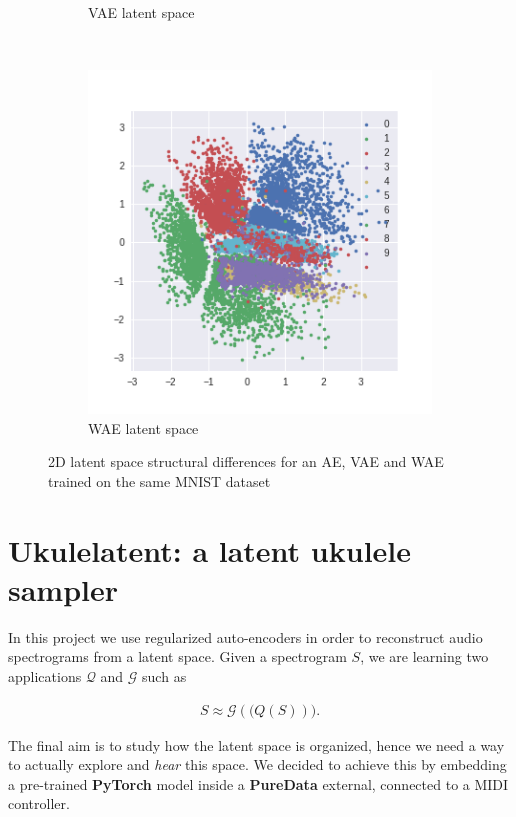 \documentclass[11pt, english]{article}
\begin{document}
\begin{figure}[h!]
{{\begin{subfigure}[t]{.35\linewidth}
    \caption{VAE latent space}
    \end{subfigure}
    ~
    \begin{subfigure}[t]{.35\linewidth}
    \centering \includegraphics[width=\linewidth]{img/WAE_Z.png}
    \caption{WAE latent space}
    \end{subfigure}
    }}
    \caption{2D latent space structural differences for an AE, VAE and WAE trained on the same MNIST dataset}\label{fig:latentspaceorg}

\end{figure}

\newpage

\section{Ukulelatent: a latent ukulele sampler}

In this project we use regularized auto-encoders in order to reconstruct audio spectrograms from a latent space. Given a spectrogram $S$, we are learning two applications $\mathcal Q$ and $\mathcal G$ such as

\begin{align}
S \approx \mathcal G(\mathcal(Q(S))).
\label{S_expression}
\end{align}

The final aim is to study how the latent space is organized, hence we need a way to actually explore and \textit{hear} this space. We decided to achieve this by embedding a pre-trained \textbf{PyTorch} model inside a \textbf{PureData} external, connected to a MIDI controller.\\
\end{document}
